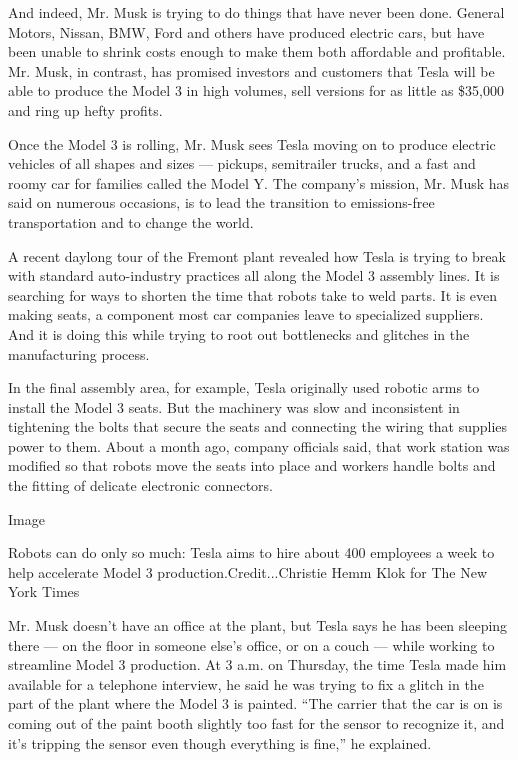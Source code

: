 And indeed, Mr. Musk is trying to do things that have never been done.
General Motors, Nissan, BMW, Ford and others have produced electric
cars, but have been unable to shrink costs enough to make them both
affordable and profitable. Mr. Musk, in contrast, has promised investors
and customers that Tesla will be able to produce the Model 3 in high
volumes, sell versions for as little as \$35,000 and ring up hefty
profits.

Once the Model 3 is rolling, Mr. Musk sees Tesla moving on to produce
electric vehicles of all shapes and sizes --- pickups, semitrailer
trucks, and a fast and roomy car for families called the Model Y. The
company's mission, Mr. Musk has said on numerous occasions, is to lead
the transition to emissions-free transportation and to change the world.

A recent daylong tour of the Fremont plant revealed how Tesla is trying
to break with standard auto-industry practices all along the Model 3
assembly lines. It is searching for ways to shorten the time that robots
take to weld parts. It is even making seats, a component most car
companies leave to specialized suppliers. And it is doing this while
trying to root out bottlenecks and glitches in the manufacturing
process.

In the final assembly area, for example, Tesla originally used robotic
arms to install the Model 3 seats. But the machinery was slow and
inconsistent in tightening the bolts that secure the seats and
connecting the wiring that supplies power to them. About a month ago,
company officials said, that work station was modified so that robots
move the seats into place and workers handle bolts and the fitting of
delicate electronic connectors.

Image

Robots can do only so much: Tesla aims to hire about 400 employees a
week to help accelerate Model 3 production.Credit...Christie Hemm Klok
for The New York Times

Mr. Musk doesn't have an office at the plant, but Tesla says he has been
sleeping there --- on the floor in someone else's office, or on a couch
--- while working to streamline Model 3 production. At 3 a.m. on
Thursday, the time Tesla made him available for a telephone interview,
he said he was trying to fix a glitch in the part of the plant where the
Model 3 is painted. ``The carrier that the car is on is coming out of
the paint booth slightly too fast for the sensor to recognize it, and
it's tripping the sensor even though everything is fine,'' he explained.


